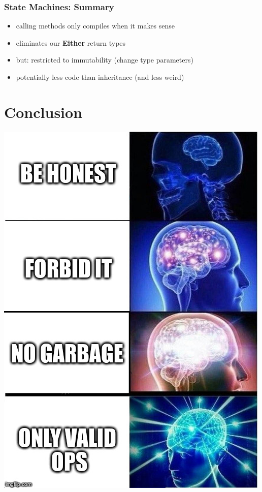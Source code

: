 \documentclass{beamer}
\begin{document}
\begin{frame}
  \frametitle{State Machines: Summary}
  \begin{itemize}
  \item calling methods only compiles when it makes sense
  \item eliminates our \textbf{Either} return types
  \item but: restricted to immutability (change type parameters)
  \item potentially less code than inheritance (and less weird)
  \end{itemize}
\end{frame}

\section{Conclusion}

\begin{frame}
  \begin{center}
    \includegraphics[width=.55\textwidth]{../pics/meme.jpg}
  \end{center}

\end{frame}
\end{document}
